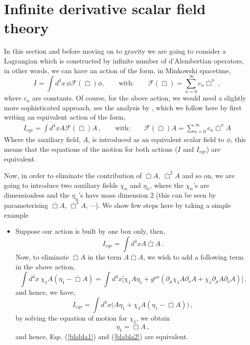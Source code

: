 \documentclass[a4paper,12pt]{article}
\newcommand{\bbox}{\bar{\Box}}
\newcommand{\+}{^{\dagger}}
\newcommand{\2}{\frac{1}{2}}
\newcommand{\3}{\frac{1}{3}}
\newcommand{\4}{\frac{1}{4}}
\newcommand{\6}{\frac{1}{6}}
\newcommand{\8}{\frac{1}{8}}
\begin{document}

\section{Infinite derivative scalar field theory}\label{inscalar}

In this section and before moving on to gravity we are going to consider a  Lagrangian which is constructed by infinite number of d'Alembertian operators, 
in other words, we can have an action of the form, in Minkowski spacetime, 
\begin{equation}\label{inftscalar}
I_{}=\int d^{4}x \, \phi\mathcal{F}(\bbox)\phi, \qquad\text{with:}\qquad\mathcal{F}(\bbox)=\sum^{\
\infty}_{n=0}c_{n}\bbox^n\,,
\end{equation}
where $c_n$ are constants. Of course, for the above action, we would need a slightly more sophisticated approach, see the analysis by \cite{Kluson:2011tb}, which we follow here  by first writing an equivalent action of the form, 
%
\begin{eqnarray}\label{eqvaction1}
I_{eqv}=\int d^{4}x A\mathcal{F}(\bbox)A\,,\qquad\text{with:}\qquad \mathcal{F}(\bbox)A=\sum^{\
\infty}_{n=0}c_{n}\bbox^{n}A
\end{eqnarray} 
Where the auxiliary field, $A$, is introduced as an equivalent scalar field to  $\phi$, this means that the equations of the 
motion for both actions ($I$ and $I_{eqv}$) are equivalent. 
 
Now, in order to eliminate the contribution of $\bbox A,~\bbox^{2}A$ and so
on, we are going to introduce two auxiliary fields $\chi_n$ and $\eta_n$,  where the $\chi_{n}$'s are dimensionless and the $\eta_{n}$'s have mass dimension $2$ (this can be seen by parameterising $\bbox A$, $\bbox^{2} A$, $\cdots$). We show few steps here by taking a simple example

\begin{itemize}
\item
Suppose our action is built by one box only, then, 
\begin{equation}\label{blabla1}
I_{eqv}=\int d^{4}x A\bbox A \,.
\end{equation}
Now,  to eliminate $\bbox A$ in the term $A\bbox A$, we wish to add a following term in the
above action, 
\begin{equation}\label{additionalterm}
\int d^{4}x~\chi_1A(\eta_1-\bbox A)=\int d^{4}x\bigg[\chi_1
A\eta_1+g^{\mu\nu}(\partial_\mu\chi_1 A \partial_\nu A+\chi_1
\partial_\mu A
\partial_\nu A)\bigg]\,.
\end{equation}   
and hence, 
we have, 
\begin{equation}\label{blabla2}
I_{eqv}=\int d^{4}x\Big( A\eta_{1}+\chi_1A(\eta_1-\bbox A)\Big)\,,
\end{equation}
by solving the equation of motion for $\chi_1$, we obtain 
\begin{equation}
\eta_1=\bbox A\,,
\end{equation} and hence, Eqs. (\ref{blabla1}) and (\ref{blabla2}) are equivalent.
\end{itemize}
\end{document}
